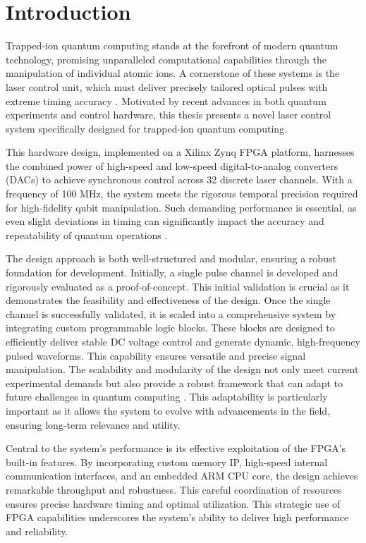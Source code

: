 \chapter{Introduction}

Trapped-ion quantum computing stands at the forefront of modern quantum technology, promising unparalleled computational capabilities through the manipulation of individual atomic ions. A cornerstone of these systems is the laser control unit, which must deliver precisely tailored optical pulses with extreme timing accuracy \cite{manychanfpgactrlsys}. Motivated by recent advances in both quantum experiments and control hardware, this thesis presents a novel laser control system specifically designed for trapped-ion quantum computing.

This hardware design, implemented on a Xilinx Zynq FPGA platform, harnesses the combined power of high-speed and low-speed digital-to-analog converters (DACs) to achieve synchronous control across 32 discrete laser channels. With a frequency of 100 MHz, the system meets the rigorous temporal precision required for high-fidelity qubit manipulation. Such demanding performance is essential, as even slight deviations in timing can significantly impact the accuracy and repeatability of quantum operations \cite{manychanfpgactrlsys}.

The design approach is both well-structured and modular, ensuring a robust foundation for development. Initially, a single pulse channel is developed and rigorously evaluated as a proof-of-concept. This initial validation is crucial as it demonstrates the feasibility and effectiveness of the design. Once the single channel is successfully validated, it is scaled into a comprehensive system by integrating custom programmable logic blocks. These blocks are designed to efficiently deliver stable DC voltage control and generate dynamic, high-frequency pulsed waveforms. This capability ensures versatile and precise signal manipulation. The scalability and modularity of the design not only meet current experimental demands but also provide a robust framework that can adapt to future challenges in quantum computing \cite{programmablesoc4ctrlexperiment}. This adaptability is particularly important as it allows the system to evolve with advancements in the field, ensuring long-term relevance and utility.

Central to the system's performance is its effective exploitation of the FPGA's built-in features. By incorporating custom memory IP, high-speed internal communication interfaces, and an embedded ARM CPU core, the design achieves remarkable throughput and robustness. This careful coordination of resources ensures precise hardware timing and optimal utilization. This strategic use of FPGA capabilities underscores the system's ability to deliver high performance and reliability.